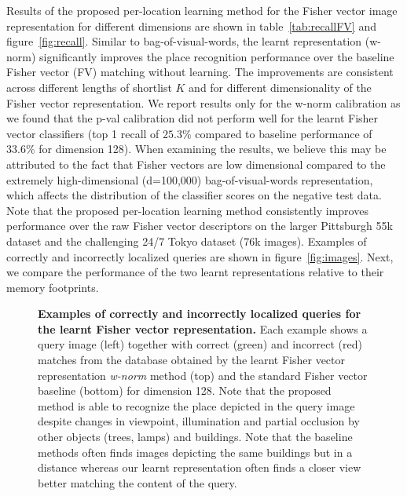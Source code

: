     Results of the proposed per-location learning method for the Fisher vector image representation for different dimensions are shown in table~\ref{tab:recallFV} and figure~\ref{fig:recall}.
    Similar to bag-of-visual-words, the learnt representation (w-norm) significantly improves the place recognition performance over the baseline Fisher vector (FV) matching without learning. The improvements are consistent across different lengths of shortlist $K$ and for different dimensionality of the Fisher vector representation. 
    We report results only for the w-norm calibration as we found that the p-val calibration did not perform well for the learnt Fisher vector classifiers (top 1 recall of $25.3\%$ compared to baseline performance of $33.6\%$ for dimension 128). When examining the results, we believe this may be attributed to the fact that Fisher vectors are low dimensional compared to the extremely high-dimensional (d=100,000) bag-of-visual-words representation, which affects the distribution of the classifier scores on the negative test data.  
     \textcolor{petr}{
    Note that the proposed per-location learning method consistently improves performance over the raw Fisher vector descriptors on the larger Pittsburgh 55k dataset and the challenging 24/7 Tokyo dataset (76k images).}
   Examples of correctly and incorrectly localized queries are shown in figure~\ref{fig:images}. 
\noindent
        Next, we compare the performance of the two learnt representations relative to their memory footprints.  

    \begin{figure}[tbp]
      
      \caption{
          \textbf{Examples of correctly and incorrectly localized queries for the learnt Fisher vector representation.}
          Each example shows a query image (left) together with correct (green) and incorrect (red) matches from the database obtained by the learnt Fisher vector representation \emph{w-norm} method (top) and the standard Fisher vector baseline (bottom) for dimension 128. Note that the proposed method is able to recognize the place depicted in the query image despite changes in viewpoint, illumination and partial occlusion by other objects (trees, lamps) and buildings. 
          Note that the baseline methods often finds images depicting the same buildings but in a distance whereas our learnt representation often finds a closer view better matching the content of the query.        
      }
      \label{fig:images_bow}
    \end{figure}
    
